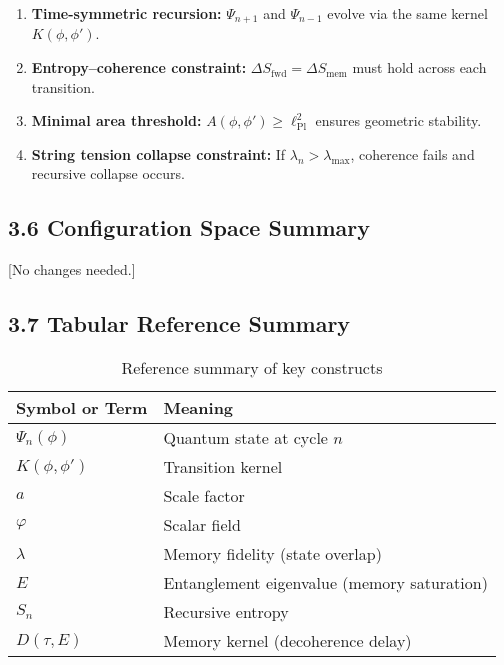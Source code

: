 \begin{enumerate}
    \item \textbf{Time-symmetric recursion:} \( \Psi_{n+1} \) and \( \Psi_{n-1} \) evolve via the same kernel \( K(\phi, \phi') \).
    \item \textbf{Entropy--coherence constraint:} \( \Delta S_{\text{fwd}} = \Delta S_{\text{mem}} \) must hold across each transition.
    \item \textbf{Minimal area threshold:} \( A(\phi, \phi') \geq \ell_{\text{Pl}}^2 \) ensures geometric stability.
    \item \textbf{String tension collapse constraint:} If \( \lambda_n > \lambda_{\text{max}} \), coherence fails and recursive collapse occurs.
\end{enumerate}

\subsection{3.6 Configuration Space Summary}

[No changes needed.]

\subsection{3.7 Tabular Reference Summary}
\label{subsec:reference-table}

\begin{table}[H]
\centering
\begin{tabular}{|l|l|}
\hline
\textbf{Symbol or Term} & \textbf{Meaning} \\
\hline
\( \Psi_n(\phi) \) & Quantum state at cycle \( n \) \\
\( K(\phi, \phi') \) & Transition kernel \\
\( a \) & Scale factor \\
\( \varphi \) & Scalar field \\
\( \lambda \) & Memory fidelity (state overlap) \\
\( E \) & Entanglement eigenvalue (memory saturation) \\
\( S_n \) & Recursive entropy \\
\( D(\tau, E) \) & Memory kernel (decoherence delay) \\
\hline
\end{tabular}
\caption{Reference summary of key constructs}
\end{table}
